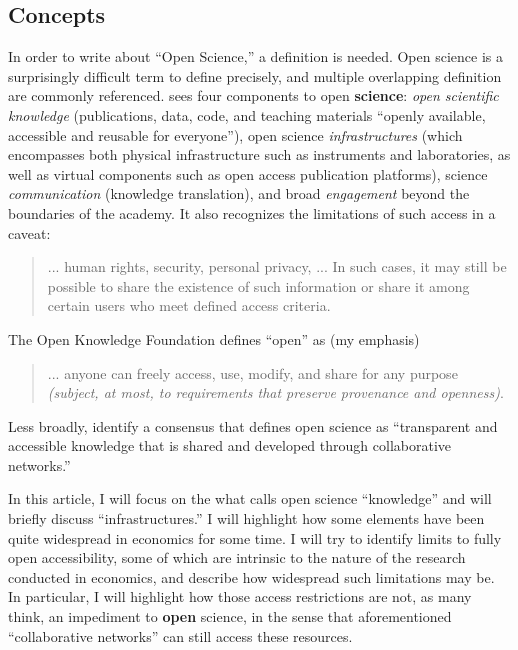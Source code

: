 \documentclass{Revue-economique}
\newcommand{\citet}{\textcite}
\begin{document}
\begin{Article} [%
	Titre={Reproducibility and Open Science in Economics},
	Auteur={Lars Vilhuber\thanks{Cornell University, lars.vilhuber@cornell.edu}}]
\begin{refsection}[Main]
\section{Concepts}

In order to write about ``Open Science,'' a definition is needed. Open science is a surprisingly difficult term to define precisely, and multiple overlapping definition are commonly referenced. 
%
\citet{unesco_understanding_2022} sees four components to open \textbf{science}: \textit{open   scientific   knowledge }(publications, data, code, and teaching materials ``openly    available, accessible and reusable for everyone''),     open     science     \textit{infrastructures} (which encompasses both physical infrastructure such as instruments and laboratories, as well as virtual components such as open access publication platforms),     science     \textit{communication} (knowledge translation),  and broad \textit{engagement} beyond the boundaries of the academy. It also recognizes the limitations of such access in a caveat: 

\begin{quote}

...  human rights, security, personal privacy, ... In such  cases,  it  may  still  be  possible  to  share  the  existence  of  such  information or share it among certain users who meet defined access criteria.
    
\end{quote}

\noindent The Open Knowledge Foundation \parencite[OKF]{open_knowledge_foundation_defining_2024} defines ``open'' as (my emphasis)

\begin{quote}

    ... anyone can freely access, use, modify, and share for any purpose \textit{(subject, at most, to requirements that preserve provenance and openness)}.
    
\end{quote}

\noindent Less broadly, \citet{vicente-saez_open_2018} identify a consensus that defines open science as ``transparent and accessible knowledge that is shared and developed through collaborative networks.''

In this article, I will focus on the what \cite{unesco_understanding_2022} calls open science ``knowledge'' and will briefly discuss ``infrastructures.'' I will highlight how some elements have been quite widespread in economics for some time. I will try to identify limits to fully open accessibility, some of which are intrinsic to the nature of the research conducted in economics, and describe how widespread such limitations may be. In particular, I will highlight how those access restrictions are not, as many think, an impediment to \textbf{open} science, in the sense that aforementioned ``collaborative networks'' can still access these resources. 



\end{refsection}
\end{Article}
\end{document}
